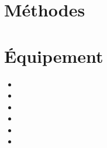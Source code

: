 \documentclass{Thesis}
\begin{document}
\section*{Méthodes}

\section*{Équipement}
\begin{multicols}{2}
\begin{itemize}
    \setlength\itemsep{1mm}
    \item 
    \item 
    \item 
    \item 
    \item 
    \item 
\end{itemize}
\end{multicols}

\newpage
\printbibliography
\end{document}
